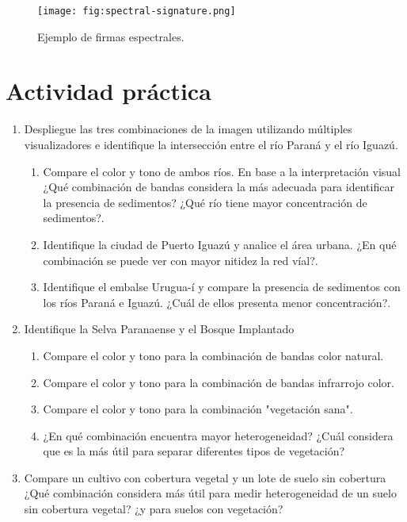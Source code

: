 \begin{figure}[h!]
    \centering
    \texttt{[image: fig:spectral-signature.png]}
    \caption{Ejemplo de firmas espectrales.}
    \label{fig:spectral-signature}
\end{figure}

\section{Actividad práctica}
\begin{enumerate}
  \item Despliegue las tres combinaciones de la imagen utilizando múltiples visualizadores e identifique la intersección entre el río Paraná y el río Iguazú.
  \begin{enumerate}
  \item Compare el color y tono de ambos ríos. En base a la interpretación visual ¿Qué combinación de bandas considera la más adecuada para identificar la presencia de sedimentos? ¿Qué río tiene mayor concentración de sedimentos?.
  
  \item  Identifique la ciudad de Puerto Iguazú y analice el área urbana. ¿En qué combinación se puede ver con mayor nitidez la red víal?.
  
  \item  Identifique el embalse Urugua-í y compare la presencia de sedimentos con los ríos Paraná e Iguazú. ¿Cuál de ellos presenta menor concentración?.
\end{enumerate}

  \item Identifique la Selva Paranaense y el Bosque Implantado
  \begin{enumerate}
    \item  Compare el color y tono para la combinación de bandas color natural.
    \item  Compare el color y tono para la combinación de bandas infrarrojo color.
    \item  Compare el color y tono para la combinación "vegetación sana".
    \item  ¿En qué combinación encuentra mayor heterogeneidad? ¿Cuál considera que es la más útil para separar diferentes tipos de vegetación?
  \end{enumerate}
      
  \item Compare un cultivo con cobertura vegetal y un lote de suelo sin cobertura  ¿Qué combinación considera más útil para medir heterogeneidad de un suelo sin cobertura vegetal? ¿y para suelos con vegetación?



\end{enumerate}
